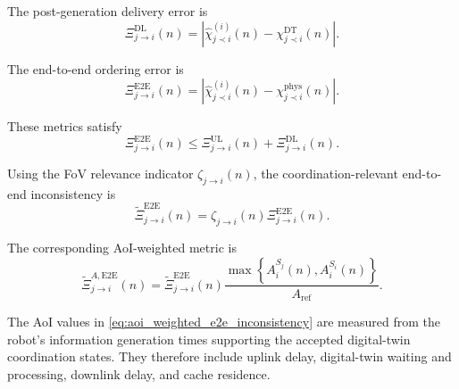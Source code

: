 \IfFileExists{IEEEtran.cls}{\documentclass[conference]{IEEEtran}}{\documentclass[10pt,twocolumn]{article}}
\begin{document}
The post-generation delivery error is
\begin{equation}
    \Xi_{j\rightarrow i}^{\mathrm{DL}}(n)
    =
    \left|
        \widehat{\chi}_{j\prec i}^{(i)}(n)
        -
        \chi_{j\prec i}^{\mathrm{DT}}(n)
    \right|.
    \label{eq:downlink_ordering_error}
\end{equation}

The end-to-end ordering error is
\begin{equation}
    \Xi_{j\rightarrow i}^{\mathrm{E2E}}(n)
    =
    \left|
        \widehat{\chi}_{j\prec i}^{(i)}(n)
        -
        \chi_{j\prec i}^{\mathrm{phys}}(n)
    \right|.
    \label{eq:end_to_end_ordering_error}
\end{equation}

These metrics satisfy
\begin{equation}
    \Xi_{j\rightarrow i}^{\mathrm{E2E}}(n)
    \leq
    \Xi_{j\rightarrow i}^{\mathrm{UL}}(n)
    +
    \Xi_{j\rightarrow i}^{\mathrm{DL}}(n).
    \label{eq:ordering_error_decomposition}
\end{equation}

Using the FoV relevance indicator \(\zeta_{j\rightarrow i}(n)\), the coordination-relevant end-to-end inconsistency is
\begin{equation}
    \widetilde{\Xi}_{j\rightarrow i}^{\mathrm{E2E}}(n)
    =
    \zeta_{j\rightarrow i}(n)
    \Xi_{j\rightarrow i}^{\mathrm{E2E}}(n).
    \label{eq:fov_e2e_inconsistency}
\end{equation}

The corresponding AoI-weighted metric is
\begin{equation}
    \widetilde{\Xi}_{j\rightarrow i}^{A,\mathrm{E2E}}(n)
    =
    \widetilde{\Xi}_{j\rightarrow i}^{\mathrm{E2E}}(n)
    \frac{
        \max
        \left\{
            A_i^{S_j}(n),
            A_i^{S_i}(n)
        \right\}
    }{
        A_{\mathrm{ref}}
    }.
    \label{eq:aoi_weighted_e2e_inconsistency}
\end{equation}

The AoI values in \eqref{eq:aoi_weighted_e2e_inconsistency} are measured from the robot's information generation times supporting the accepted digital-twin coordination states. They therefore include uplink delay, digital-twin waiting and processing, downlink delay, and cache residence.
\end{document}
